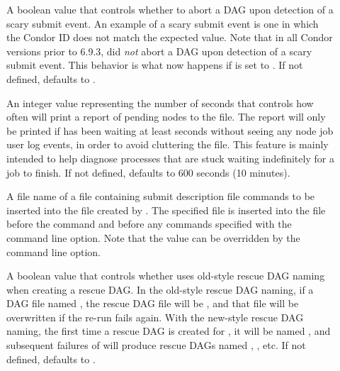 \begin{description}
\item[]
\label{param:DAGManAbortOnScarySubmit}
  A boolean value that controls whether to abort a DAG upon detection of
  a scary submit event.
  An example of a scary submit event is one in which the Condor ID
  does not match the expected value.
  Note that in all Condor versions prior to 6.9.3,
   did \emph{not} abort a DAG upon detection of
  a scary submit event.
  This behavior is what now happens if
   is set to .
  If not defined,  defaults to
  .

\label{param:DAGManPendingReportInterval}
\item[]
  An integer value representing the number of seconds that controls
  how often 
  will print a report of pending nodes to the  file.
  The report will only be printed if  has
  been waiting at least 
  seconds without seeing any node job user log events, in order to
  avoid cluttering the  file.
  This feature is mainly intended to help diagnose  processes 
  that are stuck waiting indefinitely for a job to finish.
  If not defined,
   defaults to 600 seconds
  (10 minutes).

\label{param:DAGManInsertSubFile}
\item[]
  A file name of a file containing submit description file commands to be
  inserted into the  file created by .
  The specified file is inserted into the  file before
  the  command and before any commands specified with the
    command line option.
  Note that the  value can be overridden
  by the   command line option.

\label{param:DAGManOldRescue}
\item[]
  A boolean value that controls whether  uses old-style
  rescue DAG naming when creating a rescue DAG.
  In the old-style rescue DAG naming,
  if a DAG file named , the rescue DAG file will
  be , and that file will be overwritten if the re-run
   fails again.  
  With the new-style rescue DAG naming,
  the first time a rescue DAG is created for , it will be
  named , and subsequent failures of
   will produce rescue DAGs named ,
  , etc.
  If not defined,  defaults to .


\end{description}
